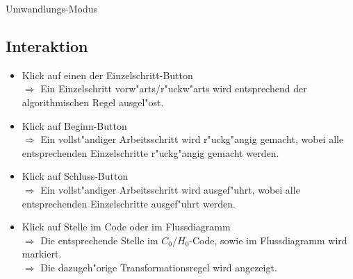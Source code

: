 	\item Umwandlungs-Modus
	
	\subsection{Interaktion}
	\begin{itemize}
		\item Klick auf einen der Einzelschritt-Button \\
		$\Rightarrow$ Ein Einzelschritt vorw"arts/r"uckw"arts wird entsprechend der algorithmischen Regel ausgel"ost.
		\item Klick auf Beginn-Button \\
		$\Rightarrow$ Ein vollst"andiger Arbeitsschritt wird r"uckg"angig gemacht, wobei alle entsprechenden Einzelschritte r"uckg"angig gemacht werden.
		\item Klick auf Schluss-Button \\
		$\Rightarrow$ Ein vollst"andiger Arbeitsschritt wird ausgef"uhrt, wobei alle entsprechenden Einzelschritte ausgef"uhrt werden.
		\item Klick auf Stelle im Code oder im Flussdiagramm \\
		$\Rightarrow$ Die entsprechende Stelle im $C_0$/$H_0$-Code, sowie im Flussdiagramm wird markiert. \\
		$\Rightarrow$ Die dazugeh"orige Transformationsregel wird angezeigt.
	\end{itemize}
